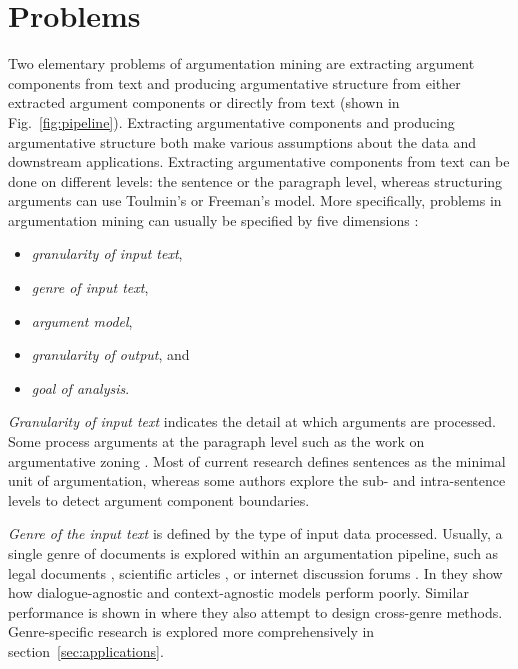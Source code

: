 \section{Problems}
\label{sec:problems}

Two elementary problems of argumentation mining are 
extracting argument components from text and producing argumentative structure
from either extracted argument components or directly from text
(shown in Fig.~\ref{fig:pipeline}). 
Extracting argumentative components and producing argumentative
structure both make various assumptions about the data and downstream
applications. 
Extracting argumentative components from text can be done on different levels:
the sentence or the paragraph level, whereas structuring arguments can use
Toulmin's or Freeman's model.
More specifically, problems in argumentation mining can
usually be specified by five dimensions \citep{lippi2016argumentation}: 
\begin{itemize}
\item \emph{granularity of input text}, 
\item \emph{genre of input text}, 
\item \emph{argument model}, 
\item \emph{granularity of output}, and
\item \emph{goal of analysis}.
\end{itemize}

\emph{Granularity of input text} indicates the detail at which arguments
are processed. Some process arguments at the paragraph level 
such as the work on argumentative zoning
\citep{teufel2009towards}. Most of current research defines
sentences as the minimal unit of argumentation,
whereas some authors explore the sub- and intra-sentence levels
to detect argument component boundaries.

\emph{Genre of the input text} is defined by the type of input data processed.
Usually, a single genre of documents is explored within an argumentation
pipeline, such as legal documents \citep{palau2009argumentation}, scientific
articles \citep{teufel2009towards}, or internet discussion forums
\citep{hasan2014you, boltuzic2014back, habernal2017argumentation}.  In
\citep{budzynska2014towards} they show how dialogue-agnostic and
context-agnostic models perform poorly.  Similar performance is shown in
\citep{daxenberger2017essence} where they also attempt to design cross-genre
methods. Genre-specific research is explored more comprehensively in 
section~\ref{sec:applications}.

